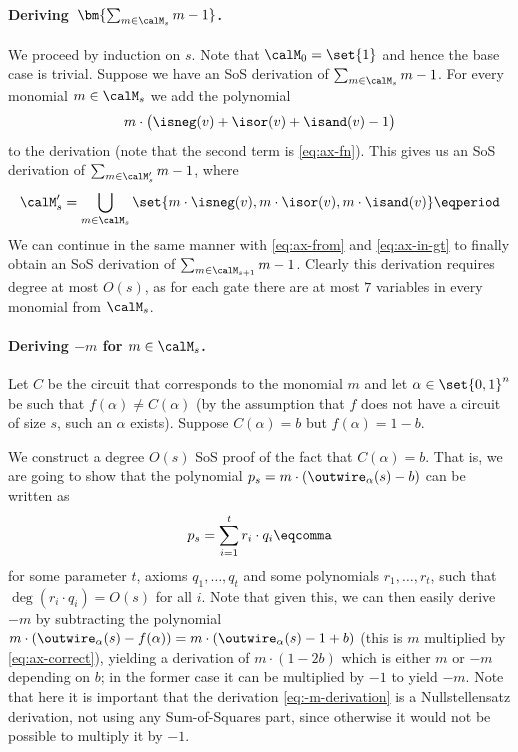 
\paragraph{Deriving~$\bm{\sum_{m \in \calM_s} m - 1}$.} We proceed
by induction on $s$. Note that $\calM_0 = \set{1}$ and hence the base
case is trivial. Suppose we have an SoS derivation of
$\sum_{m \in \calM_s} m - 1$. For every monomial $m \in \calM_s$ we
add the polynomial
\begin{align}
  m \cdot \big(\isneg(v) +  \isor(v) + \isand(v) - 1\big)
\end{align}
to the derivation (note that the second term is \cref{eq:ax-fn}). This
gives us an SoS derivation of $\sum_{m \in \calM'_s} m - 1$, where
$$\calM'_s = \bigcup_{m \in \calM_s} \set{m \cdot \isneg(v), m \cdot \isor(v), m \cdot \isand(v)}\eqperiod$$ We can continue in the same manner with
\cref{eq:ax-from} and \cref{eq:ax-in-gt} to finally obtain an SoS
derivation of $\sum_{m \in \calM_{s+1}} m - 1$. Clearly this
derivation requires degree at most $O(s)$, as for each gate there are
at most $7$ variables in every monomial from $\calM_s$.

\paragraph{Deriving $-m$ for $m \in \calM_s$.}
Let $C$ be the circuit that corresponds to the monomial $m$ and let
$\alpha \in \set{0,1}^n$ be such that $f(\alpha) \neq C(\alpha)$ (by
the assumption that $f$ does not have a circuit of size $s$, such an
$\alpha$ exists).  Suppose $C(\alpha) = b$ but $f(\alpha) = 1-b$.

We construct a degree $O(s)$ SoS proof of the fact that
$C(\alpha) = b$. That is, we are going to show that the polynomial
$p_s = m \cdot \left( \outwire_\alpha(s) - b\right)$ can be written as
\begin{align}
  \label{eq:-m-derivation}
  p_s = \sum_{i=1}^t r_i \cdot q_i \eqcomma
\end{align}
for some parameter $t$, axioms $q_1, \ldots, q_t$ and some polynomials
$r_1, \ldots, r_t$, such that $\deg(r_i \cdot q_i) = O(s)$ for all
$i$.  Note that given this, we can then easily derive $-m$ by
subtracting the polynomial
$m \cdot \left( \outwire_\alpha(s) - f(\alpha)\right) = m \cdot \left(
  \outwire_\alpha(s) - 1 + b\right)$ (this is $m$ multiplied by
\cref{eq:ax-correct}), yielding a derivation of $m \cdot (1 - 2b)$
which is either $m$ or $-m$ depending on $b$; in the former case it
can be multiplied by $-1$ to yield $-m$.  Note that here it is
important that the derivation \eqref{eq:-m-derivation} is a
Nullstellensatz derivation, not using any Sum-of-Squares part, since
otherwise it would not be possible to multiply it by $-1$.

